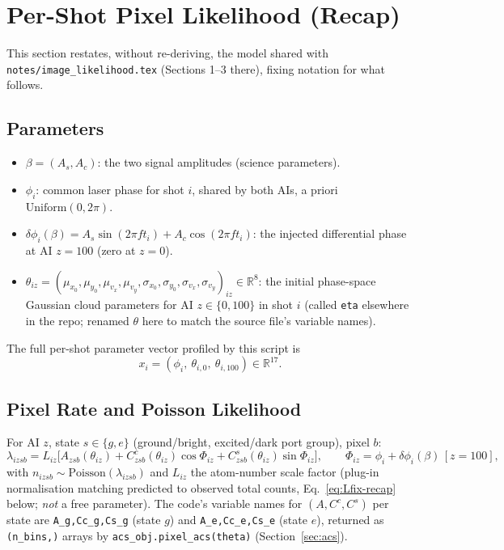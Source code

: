 \documentclass[11pt,a4paper]{article}
\newcommand{\R}{\mathbb{R}}
\newcommand{\code}[1]{\texttt{#1}}
\begin{document}
\section{Per-Shot Pixel Likelihood (Recap)}
\label{sec:likelihood}

This section restates, without re-deriving, the model shared with
\code{notes/image\_likelihood.tex} (Sections 1--3 there), fixing notation for
what follows.

\subsection{Parameters}

\begin{itemize}
  \item $\beta = (A_s, A_c)$: the two signal amplitudes (science parameters).
  \item $\phi_i$: common laser phase for shot $i$, shared by both AIs,
    a priori $\mathrm{Uniform}(0,2\pi)$.
  \item $\delta\phi_i(\beta) = A_s\sin(2\pi f t_i) + A_c\cos(2\pi f t_i)$:
    the injected differential phase at AI $z=100$ (zero at $z=0$).
  \item $\theta_{iz} = (\mu_{x_0},\mu_{y_0},\mu_{v_x},\mu_{v_y},
    \sigma_{x_0},\sigma_{y_0},\sigma_{v_x},\sigma_{v_y})_{iz} \in \R^8$: the
    initial phase-space Gaussian cloud parameters for AI $z\in\{0,100\}$ in
    shot $i$ (called \code{eta} elsewhere in the repo; renamed $\theta$ here
    to match the source file's variable names).
\end{itemize}

The full per-shot parameter vector profiled by this script is
\begin{equation}
  x_i = (\phi_i,\ \theta_{i,0},\ \theta_{i,100}) \in \R^{17}.
  \label{eq:xi}
\end{equation}

\subsection{Pixel Rate and Poisson Likelihood}

For AI $z$, state $s\in\{g,e\}$ (ground/bright, excited/dark port group),
pixel $b$:
\begin{equation}
  \lambda_{izsb}
  = L_{iz}\bigl[A_{zsb}(\theta_{iz}) + C^c_{zsb}(\theta_{iz})\cos\Phi_{iz}
                                     + C^s_{zsb}(\theta_{iz})\sin\Phi_{iz}\bigr],
  \qquad
  \Phi_{iz} = \phi_i + \delta\phi_i(\beta)\,[z{=}100],
  \label{eq:lambda}
\end{equation}
with $n_{izsb}\sim\mathrm{Poisson}(\lambda_{izsb})$ and $L_{iz}$ the
atom-number scale factor (plug-in normalisation matching predicted to
observed total counts, Eq.~\ref{eq:Lfix-recap} below; \emph{not} a free
parameter). The code's variable names for $(A,C^c,C^s)$ per state are
\code{A\_g,Cc\_g,Cs\_g} (state $g$) and \code{A\_e,Cc\_e,Cs\_e} (state $e$),
returned as \code{(n\_bins,)} arrays by \code{acs\_obj.pixel\_acs(theta)}
(Section~\ref{sec:acs}).
\end{document}
